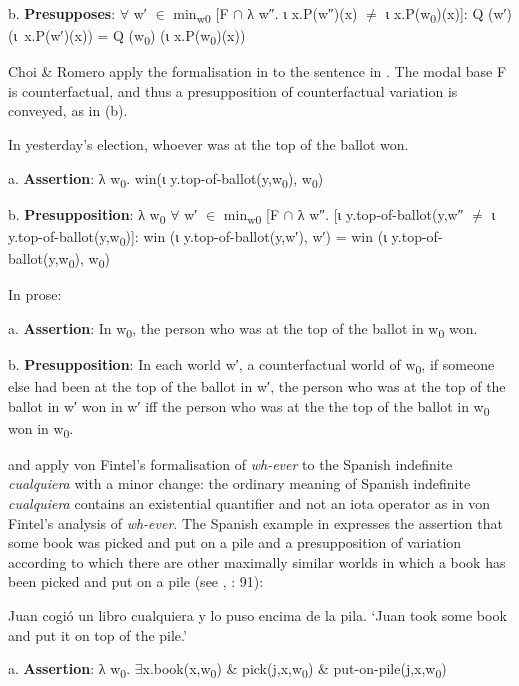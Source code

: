 \documentclass[output=paper]{langscibook}
\begin{document}
  b.  \textbf{Presupposes}: ${\forall}$ w′ ${\in}$ min\textsubscript{w0} [F ${\cap}$ λ w″. ι x.P(w″)(x) ${\neq}$ ι x.P(w\textsubscript{0})(x)]: Q (w′) (ι~x.P(w′)(x)) = Q (w\textsubscript{0}) (ι x.P(w\textsubscript{0})(x))

Choi \& Romero apply the formalisation\textstyleannotationreference{} in  to the sentence in . The modal base F is counterfactual, and thus a presupposition of counterfactual variation is conveyed, as in (b).

\label{bkm:Ref150779072}  In yesterday’s election, whoever was at the top of the ballot won.

  a.  \textbf{Assertion}: λ w\textsubscript{0}. win(ι y.top-of-ballot(y,w\textsubscript{0}), w\textsubscript{0})

  b.  \textbf{Presupposition}: λ w\textsubscript{0} ${\forall}$ w′ ${\in}$ min\textsubscript{w0} [F ${\cap}$ λ w″. [ι y.top-of-ballot(y,w″ ${\neq}$ ι y.top-of-ballot(y,w\textsubscript{0})]: win (ι y.top-of-ballot(y,w′), w′) = win (ι y.top-of-ballot(y,w\textsubscript{0}), w\textsubscript{0})

In prose:

  a.  \textbf{Assertion}: In w\textsubscript{0}, the person who was at the top of the ballot in w\textsubscript{0} won.

  b.  \textbf{Presupposition}: In each world w′, a counterfactual world of w\textsubscript{0}, if someone else had been at the top of the ballot in w′, the person who was at the top of the ballot in w′ won in w′ iff the person who was at the the top of the ballot in w\textsubscript{0} won in w\textsubscript{0}.

\citet{Choi2007} and \citet{ChoiRomero2008} apply von Fintel’s formalisation of \textit{wh-ever} to the Spanish indefinite \textit{cualquiera} with a minor change: the ordinary meaning of Spanish indefinite \textit{cualquiera} contains an existential quantifier and not an iota operator as in von Fintel’s analysis of \textit{wh-ever}. The Spanish example in  expresses the assertion that some book was picked and put on a pile and a presupposition of variation according to which there are other maximally similar worlds in which a book has been picked and put on a pile (see \citealt{Choi2007}, \citealt{ChoiRomero2008}: 91):

\label{bkm:Ref517736}  Juan cogió un libro cualquiera y lo puso encima de la pila. ‘Juan took some book and put it on top of the pile.’ 

  a.  \textbf{Assertion}: λ w\textsubscript{0}. ${\exists}$x.book(x,w\textsubscript{0}) \& pick(j,x,w\textsubscript{0}) \& put-on-pile(j,x,w\textsubscript{0})
\end{document}
